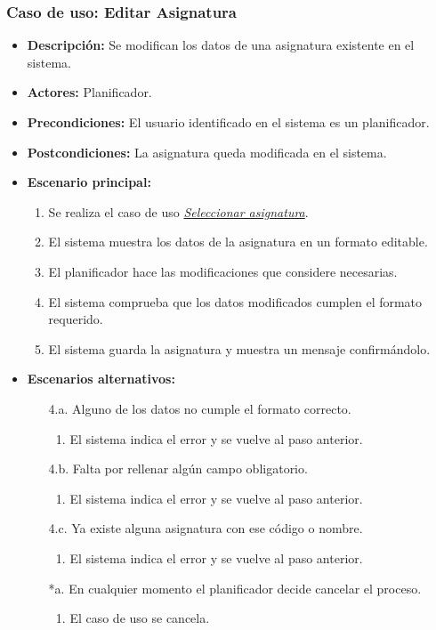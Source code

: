 \subsubsection*{Caso de uso: Editar Asignatura}
\begin{itemize}
\item{\bf Descripción:} Se modifican los datos de una asignatura existente en el sistema.
\item{\bf Actores:} Planificador.
\item{\bf Precondiciones:} El usuario identificado en el sistema es un planificador.
\item{\bf Postcondiciones:} La asignatura queda modificada en el sistema.
\item{\bf Escenario principal:}
	\begin{enumerate}
	\item Se realiza el caso de uso {\em \hyperref[select_asignatura]{Seleccionar asignatura}}.
	\item El sistema muestra los datos de la asignatura en un formato editable.
	\item El planificador hace las modificaciones que considere necesarias.
	\item El sistema comprueba que los datos modificados cumplen el formato requerido.
	\item El sistema guarda la asignatura y muestra un mensaje confirmándolo.
	\end{enumerate}
\item{\bf Escenarios alternativos:}
	\begin{itemize}
	\item[4.a.] Alguno de los datos no cumple el formato correcto.
		\begin{enumerate}
		\item El sistema indica el error y se vuelve al paso anterior.
		\end{enumerate}
	\item[4.b.] Falta por rellenar algún campo obligatorio.
		\begin{enumerate}
		\item El sistema indica el error y se vuelve al paso anterior.
		\end{enumerate}
	\item[4.c.] Ya existe alguna asignatura con ese código o nombre.
		\begin{enumerate}
		\item El sistema indica el error y se vuelve al paso anterior.
		\end{enumerate}
	\item[*a.] En cualquier momento el planificador decide cancelar el proceso.
		\begin{enumerate}
		\item El caso de uso se cancela.
		\end{enumerate}
	\end{itemize}
\end{itemize}



